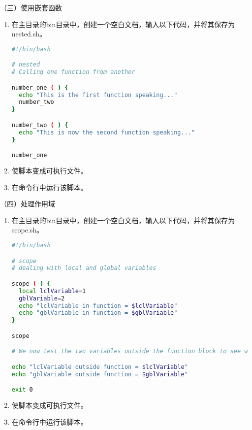 \vspace{0.1in}
（三）使用嵌套函数
\begin{enumerate}
  \item 在主目录的bin目录中，创建一个空白文档，输入以下代码，并将其保存为nested.sh。
\begin{lstlisting}[language=bash]
#!/bin/bash

# nested
# Calling one function from another

number_one ( ) {
  echo "This is the first function speaking..."
  number_two
}

number_two ( ) {
  echo "This is now the second function speaking..."
}

number_one
\end{lstlisting}
  \item 使脚本变成可执行文件。
  \item 在命令行中运行该脚本。
\end{enumerate}

\vspace{0.1in}
（四）处理作用域
\begin{enumerate}
  \item 在主目录的bin目录中，创建一个空白文档，输入以下代码，并将其保存为scope.sh。
\begin{lstlisting}[language=bash]
#!/bin/bash

# scope
# dealing with local and global variables

scope ( ) {
  local lclVariable=1
  gblVariable=2
  echo "lclVariable in function = $lclVariable"
  echo "gblVariable in function = $gblVariable"
}

scope

# We now test the two variables outside the function block to see what happens

echo "lclVariable outside function = $lclVariable"
echo "gblVariable outside function = $gblVariable"

exit 0
\end{lstlisting}
  \item 使脚本变成可执行文件。
  \item 在命令行中运行该脚本。
\end{enumerate}


